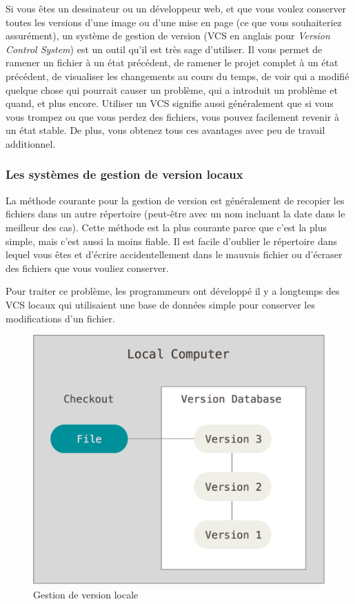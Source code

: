 Si vous êtes un dessinateur ou un développeur web, et que vous voulez conserver toutes les versions d'une image ou d'une mise en page (ce que vous souhaiteriez assurément), un système de gestion de version (VCS en anglais pour \emph{Version Control System}) est un outil qu'il est très sage d'utiliser.
Il vous permet de ramener un fichier à un état précédent, de ramener le projet complet à un état précédent, de visualiser les changements au cours du temps, de voir qui a modifié quelque chose qui pourrait causer un problème, qui a introduit un problème et quand, et plus encore.
Utiliser un VCS signifie aussi généralement que si vous vous trompez ou que vous perdez des fichiers, vous pouvez facilement revenir à un état stable.
De plus, vous obtenez tous ces avantages avec peu de travail additionnel.

\subsubsection{Les systèmes de gestion de version locaux}

La méthode courante pour la gestion de version est généralement de recopier les fichiers dans un autre répertoire (peut-être avec un nom incluant la date dans le meilleur des cas).
Cette méthode est la plus courante parce que c'est la plus simple, mais c'est aussi la moins fiable.
Il est facile d'oublier le répertoire dans lequel vous êtes et d'écrire accidentellement dans le mauvais fichier ou d'écraser des fichiers que vous vouliez conserver.

Pour traiter ce problème, les programmeurs ont développé il y a longtemps des VCS locaux qui utilisaient une base de données simple pour conserver les modifications d'un fichier.

\begin{figure}[H]
  \centering
  \includegraphics{images/local}
  \caption{Gestion de version locale}
  \label{fig:git:local}
\end{figure}

